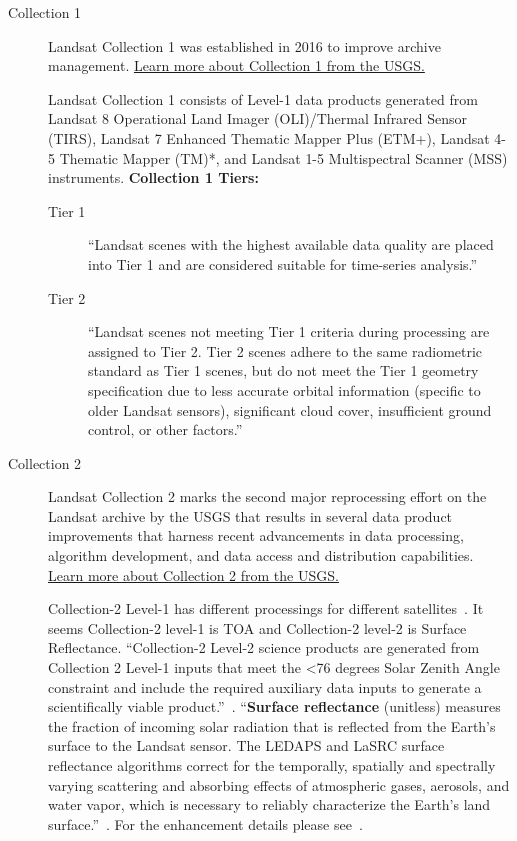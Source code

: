 \documentclass{article}
\begin{document}
\begin{description}
\item [Collection 1] Landsat Collection 1 was established in 2016 to improve archive management.
\href{https://www.usgs.gov/core-science-systems/nli/landsat/landsat-collection-1?qt-science_support_page_related_con=1#qt-science_support_page_related_con}{Learn more about Collection 1 from the USGS.}

Landsat Collection 1 consists of Level-1 data products 
generated from Landsat 8 Operational Land Imager (OLI)/Thermal 
Infrared Sensor (TIRS), Landsat 7 Enhanced Thematic Mapper 
Plus (ETM+), Landsat 4-5 Thematic Mapper (TM)*, and Landsat 1-5 
Multispectral Scanner (MSS) instruments.
\textbf{Collection 1 Tiers:}
\begin{description}
\item [Tier 1]
``Landsat scenes with the highest available data quality are placed into 
Tier 1 and are considered suitable for time-series analysis.''~\cite{C1Describe}

\item [Tier 2] ``Landsat scenes not meeting Tier 1 criteria during processing
 are assigned to Tier 2. Tier 2 scenes adhere to the same radiometric 
 standard as Tier 1 scenes, but do not meet the Tier 1 geometry 
 specification due to less accurate orbital information 
 (specific to older Landsat sensors), significant cloud cover, 
 insufficient ground control, or other factors.''~\cite{C1Describe}
\end{description}



\item [Collection 2] 
Landsat Collection 2 marks the second major reprocessing effort on 
the Landsat archive by the USGS that results in several data product 
improvements that harness recent advancements in data processing, 
algorithm development, and data access and distribution capabilities. 
\href{https://www.usgs.gov/core-science-systems/nli/landsat/landsat-collection-2?qt-science_support_page_related_con=1#}{Learn more about Collection 2 from the USGS.}

Collection-2 Level-1 has different processings for different satellites~\cite{C2L1Describe}.
It seems Collection-2 level-1 is TOA and Collection-2 level-2 is Surface Reflectance. 
``Collection-2 Level-2 science products are generated from Collection 2 Level-1 
inputs that meet the <76 degrees Solar Zenith Angle constraint and include the 
required auxiliary data inputs to generate a scientifically viable product.''~\cite{C2L2Describe}.
``\textbf{Surface reflectance} (unitless) 
measures the fraction of incoming solar radiation that is 
reflected from the Earth's surface to the Landsat sensor. 
The LEDAPS and LaSRC surface reflectance algorithms 
correct for the temporally, spatially and spectrally varying scattering 
and absorbing effects of atmospheric gases, aerosols, and water vapor, 
which is necessary to reliably characterize the Earth’s land surface.''~\cite{C2L2Describe}.
For the enhancement details please see~\cite{C2L2Describe}.
\end{description}
\end{document}

